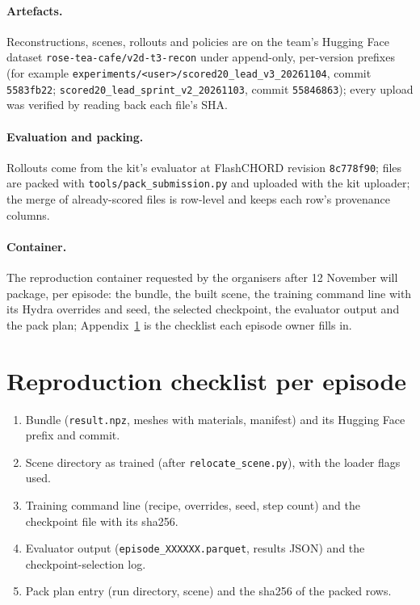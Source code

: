 \documentclass[10pt,a4paper]{article}
\newcommand{\code}[1]{\texttt{#1}}
\begin{document}
\paragraph{Artefacts.} Reconstructions, scenes, rollouts and policies are on the team's Hugging Face dataset \code{rose-tea-cafe/v2d-t3-recon} under append-only, per-version prefixes (for example \code{experiments/<user>/scored20\_lead\_v3\_20261104}, commit \code{5583fb22}; \code{scored20\_lead\_sprint\_v2\_20261103}, commit \code{55846863}); every upload was verified by reading back each file's SHA.

\paragraph{Evaluation and packing.} Rollouts come from the kit's evaluator at FlashCHORD revision \code{8c778f90}; files are packed with \code{tools/pack\_submission.py} and uploaded with the kit uploader; the merge of already-scored files is row-level and keeps each row's provenance columns.

\paragraph{Container.} The reproduction container requested by the organisers after 12 November will package, per episode: the bundle, the built scene, the training command line with its Hydra overrides and seed, the selected checkpoint, the evaluator output and the pack plan; Appendix~\ref{app:checklist} is the checklist each episode owner fills in.

\appendix
\section{Reproduction checklist per episode}
\label{app:checklist}
\begin{enumerate}
\item Bundle (\code{result.npz}, meshes with materials, manifest) and its Hugging Face prefix and commit.
\item Scene directory as trained (after \code{relocate\_scene.py}), with the loader flags used.
\item Training command line (recipe, overrides, seed, step count) and the checkpoint file with its sha256.
\item Evaluator output (\code{episode\_XXXXXX.parquet}, results JSON) and the checkpoint-selection log.
\item Pack plan entry (run directory, scene) and the sha256 of the packed rows.
\end{enumerate}
\end{document}
